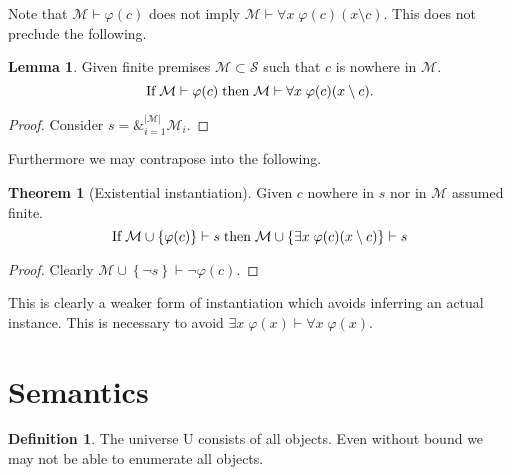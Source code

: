 \documentclass{amsbook}
\newcommand{\setsm}[1]{\left\{#1\right\}}
\newcommand{\infers}{\mathrel\vdash}
\newcommand{\univ}[1]{\mathord\forall#1\;}
\newcommand{\exis}[1]{\mathord\exists#1\;}
\DeclareMathOperator*{\amp}{\&}
\theoremstyle{definition}
\newtheorem{thm}{Theorem}[section]
\newtheorem{lmm}{Lemma}[section]
\newtheorem{dfn}{Definition}[section]
\begin{document}
Note that $\mathcal M \infers \varphi(c)$ does not imply $\mathcal M \infers \univ x \varphi(c)(x \setminus c)$. This does not preclude the following.

\begin{lmm}
    Given finite premises $\mathcal M \subset \mathcal S$ such that $c$ is nowhere in $\mathcal M$.
    $$\text{If\;} \mathcal M \infers \varphi(c) \text{\;then\;} \mathcal M \infers \univ x \varphi(c)(x \setminus c)\text.$$
    \begin{proof}
        Consider $s = \amp_{i=1}^{|\mathcal M|} \mathcal M_i$.
    \end{proof}
\end{lmm}

Furthermore we may contrapose into the following.

\begin{thm}[Existential instantiation]
    Given $c$ nowhere in $s$ nor in $\mathcal M$ assumed finite.
    $$\text{If\;} \mathcal M \cup \setsm{\varphi(c)} \infers s \text{\;then\;} \mathcal M \cup \setsm{\exis x \varphi(c)(x \setminus c)} \infers s$$
    \begin{proof}
        Clearly $\mathcal M \cup \setsm{\neg s} \infers \neg\varphi(c)$.
    \end{proof}
\end{thm}

This is clearly a weaker form of instantiation which avoids inferring an actual instance. This is necessary to avoid $\exis x \varphi(x) \infers \univ x \varphi(x)$.

\section{Semantics}

\begin{dfn}
    The universe $\mathrm U$ consists of all objects. Even without bound we may not be able to enumerate all objects.
\end{dfn}
\end{document}
